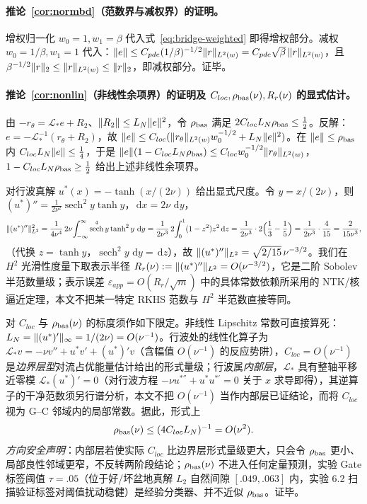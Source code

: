 \documentclass[fontset=windows,11pt]{ctexart}
\DeclarePairedDelimiter{\norm}{\lVert}{\rVert}
\newcommand{\Lop}{\mathcal L}
\newcommand{\dd}{\,\mathrm d}
\DeclareMathOperator{\sech}{sech}
\numberwithin{equation}{section}
\begin{document}
\paragraph{推论~\ref{cor:normbd}（范数界与减权界）的证明。}
增权归一化 $w_0=1,w_1=\beta$ 代入式~\eqref{eq:bridge-weighted} 即得增权部分。减权 $w_0=1/\beta,w_1=1$ 代入：$\norm e\le C_{pde}(1/\beta)^{-1/2}\norm r_{L^2(w)}=C_{pde}\sqrt\beta\,\norm r_{L^2(w)}$，且 $\beta^{-1/2}\norm r_2\le\norm r_{L^2(w)}\le\norm r_2$，即减权部分。证毕。

\paragraph{推论~\ref{cor:nonlin}（非线性余项界）的证明及 $C_{loc},\rho_{\rm bas}(\nu),R_r(\nu)$ 的显式估计。}
由 $-r_\theta=\Lop_*e+R_2$、$\norm{R_2}\le L_N\norm e^2$，令 $\rho_{\rm bas}$ 满足 $2C_{loc}L_N\rho_{\rm bas}\le\tfrac12$。反解：$e=-\Lop_*^{-1}(r_\theta+R_2)$，故 $\norm e\le C_{loc}(\norm{r_\theta}_{L^2(w)}w_0^{-1/2}+L_N\norm e^2)$。在 $\norm e\le\rho_{\rm bas}$ 内 $C_{loc}L_N\norm e\le\tfrac14$，于是 $\norm e(1-C_{loc}L_N\rho_{\rm bas})\le C_{loc}w_0^{-1/2}\norm{r_\theta}_{L^2(w)}$，$1-C_{loc}L_N\rho_{\rm bas}\ge\tfrac12$ 给出上述非线性余项界。
\par
对行波真解 $u^*(x)=-\tanh(x/(2\nu))$ 给出显式尺度。令 $y=x/(2\nu)$，则 $(u^*)''=\tfrac{1}{2\nu^2}\sech^{2}y\tanh y$，$\dd x=2\nu\,\dd y$，
\begin{equation}\label{eq:rr}
\norm{(u^*)''}_{L^2}^2=\frac{1}{4\nu^4}\,2\nu\!\int_{-\infty}^{\infty}\sech^{4}y\tanh^2y\,\dd y
=\frac{1}{2\nu^3}\,2\!\int_0^1(1-z^2)z^2\dd z
=\frac{1}{2\nu^3}\cdot 2\Big(\frac13-\frac15\Big)
=\frac{1}{2\nu^3}\cdot\frac{4}{15}
=\frac{2}{15\nu^3},
\end{equation}
（代换 $z=\tanh y$，$\sech^{2}y\,\dd y=\dd z$），故 $\norm{(u^*)''}_{L^2}=\sqrt{2/15}\,\nu^{-3/2}$。我们在 $H^2$ 光滑性度量下取表示半径 $R_r(\nu):=\norm{(u^*)''}_{L^2}=O(\nu^{-3/2})$，它是二阶 Sobolev 半范数量级；表示误差 $\varepsilon_{app}=O(R_r/\sqrt m)$ 中的具体常数依赖所采用的 NTK/核逼近定理，本文不把某一特定 RKHS 范数与 $H^2$ 半范数直接等同。
\par
对 $C_{loc}$ 与 $\rho_{\rm bas}(\nu)$ 的标度须作如下限定。非线性 Lipschitz 常数可直接算死：$L_N=\norm{(u^*)'}_\infty=1/(2\nu)=O(\nu^{-1})$。行波处的线性化算子为 $\Lop_*v=-\nu v''+u^*v'+(u^*)'v$（含幅值 $O(\nu^{-1})$ 的反应势阱），$C_{loc}=O(\nu^{-1})$ 是\emph{边界层型}对流占优能量估计给出的形式量级\cite{RoosStynesTobiska1996}；行波属\emph{内部层}，$\Lop_*$ 具有整轴平移近零模 $\Lop_*(u^*)'=0$（对行波方程 $-\nu u^{*''}+u^*u^{*'}=0$ 关于 $x$ 求导即得），其逆算子的干净范数须另行谱分析，本文不把 $O(\nu^{-1})$ 当作内部层已证结论，而将 $C_{loc}$ 视为 G--C 邻域内的局部常数。据此，形式上
\begin{equation}\label{eq:rhoscale}
\rho_{\rm bas}(\nu)\le(4C_{loc}L_N)^{-1}=O(\nu^{2}).
\end{equation}
\emph{方向安全声明}：内部层若使实际 $C_{loc}$ 比边界层形式量级更大，只会令 $\rho_{\rm bas}$ 更小、局部良性邻域更窄，不反转两阶段结论；$\rho_{\rm bas}(\nu)$ 不进入任何定量预测，实验 Gate 标签阈值 $\tau=.05$（位于好/坏盆地真解 $L_2$ 自然间隙 $[.049,.063]$ 内，实验 6.2 扫描验证标签对阈值扰动稳健）是经验分类器、并不近似 $\rho_{\rm bas}$。证毕。
\end{document}
